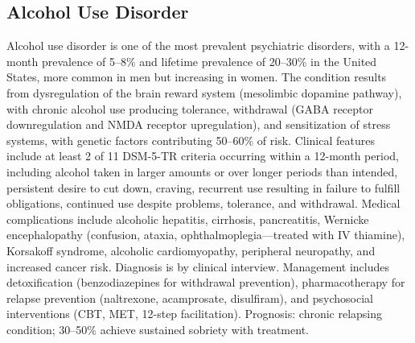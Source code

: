 






\label{sec:Substance-Related and Addictive Disorders}

\subsection{Alcohol Use Disorder}
\label{sec:Alcohol Use Disorder}
Alcohol use disorder is one of the most prevalent psychiatric disorders, with a 12-month prevalence of 5--8\% and lifetime prevalence of 20--30\% in the United States, more common in men but increasing in women. The condition results from dysregulation of the brain reward system (mesolimbic dopamine pathway), with chronic alcohol use producing tolerance, withdrawal (GABA receptor downregulation and NMDA receptor upregulation), and sensitization of stress systems, with genetic factors contributing 50--60\% of risk. Clinical features include at least 2 of 11 DSM-5-TR criteria occurring within a 12-month period, including alcohol taken in larger amounts or over longer periods than intended, persistent desire to cut down, craving, recurrent use resulting in failure to fulfill obligations, continued use despite problems, tolerance, and withdrawal. Medical complications include alcoholic hepatitis, cirrhosis, pancreatitis, Wernicke encephalopathy (confusion, ataxia, ophthalmoplegia---treated with IV thiamine), Korsakoff syndrome, alcoholic cardiomyopathy, peripheral neuropathy, and increased cancer risk. Diagnosis is by clinical interview. Management includes detoxification (benzodiazepines for withdrawal prevention), pharmacotherapy for relapse prevention (naltrexone, acamprosate, disulfiram), and psychosocial interventions (CBT, MET, 12-step facilitation). Prognosis: chronic relapsing condition; 30--50\% achieve sustained sobriety with treatment.

